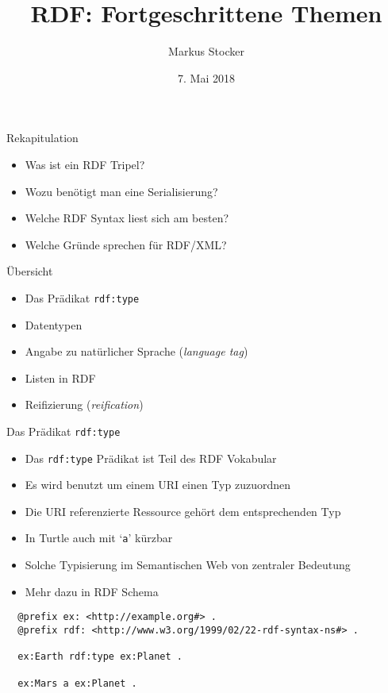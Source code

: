 \documentclass{beamer}
\title{RDF: Fortgeschrittene Themen}
\author{Markus Stocker}
\date{7. Mai 2018}
\begin{document}
\maketitle

\begin{frame}{Rekapitulation}
	
	\begin{itemize}
		\item Was ist ein RDF Tripel?
		\item Wozu benötigt man eine Serialisierung?
		\item Welche RDF Syntax liest sich am besten?
		\item Welche Gründe sprechen für RDF/XML?
	\end{itemize}
	
\end{frame}

\begin{frame}{Übersicht}
	
	\begin{itemize}
		\item Das Prädikat \texttt{rdf:type}
		\item Datentypen
		\item Angabe zu natürlicher Sprache (\emph{language tag})
		\item Listen in RDF
		\item Reifizierung (\emph{reification})
	\end{itemize}
	
\end{frame}

\begin{frame}[fragile]{Das Prädikat \texttt{rdf:type}}
	
	\begin{itemize}
		\item Das \texttt{rdf:type} Prädikat ist Teil des RDF Vokabular
		\item Es wird benutzt um einem URI einen Typ zuzuordnen
		\item Die URI referenzierte Ressource gehört dem entsprechenden Typ
		\item In Turtle auch mit `\texttt{a}' kürzbar
		\item Solche Typisierung im Semantischen Web von zentraler Bedeutung
		\item Mehr dazu in RDF Schema
	\end{itemize}
	
	\small
	\begin{lstlisting}
  @prefix ex: <http://example.org#> .
  @prefix rdf: <http://www.w3.org/1999/02/22-rdf-syntax-ns#> .
    
  ex:Earth rdf:type ex:Planet .
  
  ex:Mars a ex:Planet . 
	\end{lstlisting}
	
\end{frame}
\end{document}
